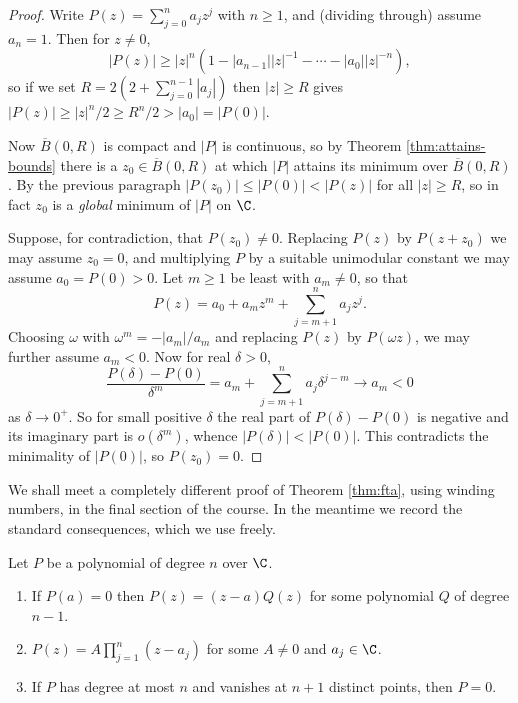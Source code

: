 \begin{proof}
	Write $P(z) = \sum_{j=0}^n a_j z^j$ with $n \geq 1$, and (dividing through) assume $a_n = 1$. Then for $z \neq 0$,
	$$|P(z)| \geq |z|^n\left(1 - |a_{n-1}||z|^{-1} - \cdots - |a_0||z|^{-n}\right),$$
	so if we set $R = 2\left(2 + \sum_{j=0}^{n-1}|a_j|\right)$ then $|z| \geq R$ gives $|P(z)| \geq |z|^n/2 \geq R^n /2 > |a_0| = |P(0)|$.

	Now $\overline{B}(0,R)$ is compact and $|P|$ is continuous, so by Theorem \ref{thm:attains-bounds} there is a $z_0 \in \overline{B}(0,R)$ at which $|P|$ attains its minimum over $\overline{B}(0,R)$. By the previous paragraph $|P(z_0)| \leq |P(0)| < |P(z)|$ for all $|z| \geq R$, so in fact $z_0$ is a \emph{global} minimum of $|P|$ on $\C$.

	Suppose, for contradiction, that $P(z_0) \neq 0$. Replacing $P(z)$ by $P(z+z_0)$ we may assume $z_0 = 0$, and multiplying $P$ by a suitable unimodular constant we may assume $a_0 = P(0) > 0$. Let $m \geq 1$ be least with $a_m \neq 0$, so that
	$$P(z) = a_0 + a_m z^m + \sum_{j = m+1}^n a_j z^j.$$
	Choosing $\omega$ with $\omega^m = -|a_m|/a_m$ and replacing $P(z)$ by $P(\omega z)$, we may further assume $a_m < 0$. Now for real $\delta > 0$,
	$$\frac{P(\delta)-P(0)}{\delta^m} = a_m + \sum_{j=m+1}^{n} a_j \delta^{j-m} \to a_m < 0$$
	as $\delta \to 0^+$. So for small positive $\delta$ the real part of $P(\delta)-P(0)$ is negative and its imaginary part is $o(\delta^m)$, whence $|P(\delta)| < |P(0)|$. This contradicts the minimality of $|P(0)|$, so $P(z_0) = 0$.
\end{proof}

We shall meet a completely different proof of Theorem \ref{thm:fta}, using winding numbers, in the final section of the course. In the meantime we record the standard consequences, which we use freely.

\begin{lemma}\label{lem:poly-roots}
	Let $P$ be a polynomial of degree $n$ over $\C$.
	\begin{enumerate}[label=(\roman*)]
		\item If $P(a) = 0$ then $P(z) = (z-a)Q(z)$ for some polynomial $Q$ of degree $n-1$.
		\item $P(z) = A\prod_{j=1}^n (z-a_j)$ for some $A \neq 0$ and $a_j \in \C$.
		\item If $P$ has degree at most $n$ and vanishes at $n+1$ distinct points, then $P = 0$.
	\end{enumerate}
\end{lemma}

